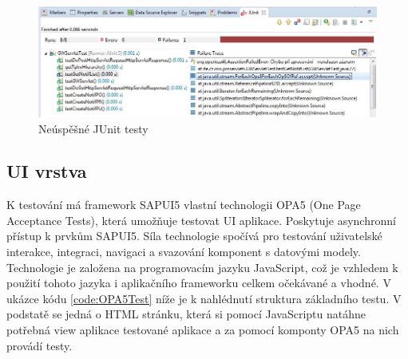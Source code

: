 \documentclass[thesis=M,czech]{FITthesis}[2012/06/26]
\begin{document}
\begin{figure}[H]
	\centering
	\includegraphics[width=1\textwidth]{images/unit_test_error}
	\caption{Neúspěšné JUnit testy}
	\label{img:unit_test_error}
\end{figure}

\subsection{UI vrstva}
K testování má framework SAPUI5 vlastní technologii OPA5 (One Page Acceptance Tests), která umožňuje testovat UI aplikace. Poskytuje asynchronní přístup k prvkům SAPUI5. Síla technologie spočívá pro testování uživatelské interakce, integraci, navigaci a svazování komponent s datovými modely. Technologie je založena na programovacím jazyku JavaScript, což je vzhledem k použití tohoto jazyka i aplikačního frameworku celkem očekávané a vhodné. V ukázce kódu \ref{code:OPA5Test} níže je k nahlédnutí struktura základního testu. V podstatě se jedná o HTML stránku, která si pomocí JavaScriptu natáhne potřebná view aplikace testované aplikace a za pomocí komponty OPA5 na nich provádí testy.
\end{document}
